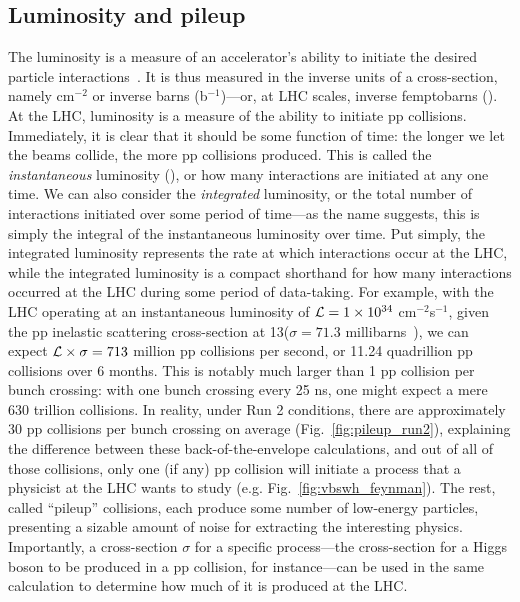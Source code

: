 \subsection{Luminosity and pileup}
The luminosity is a measure of an accelerator's ability to initiate the desired particle interactions~\cite{Herr:941318}. 
It is thus measured in the inverse units of a cross-section, namely cm$^{-2}$ or inverse barns (b$^{-1}$)---or, at LHC scales, inverse femptobarns (\fbinv).
At the LHC, luminosity is a measure of the ability to initiate pp collisions. 
Immediately, it is clear that it should be some function of time: the longer we let the beams collide, the more pp collisions produced. 
This is called the \textit{instantaneous} luminosity (\Lumi), or how many interactions are initiated at any one time. 
We can also consider the \textit{integrated} luminosity, or the total number of interactions initiated over some period of time---as the name suggests, this is simply the integral of the instantaneous luminosity over time. 
Put simply, the integrated luminosity represents the rate at which interactions occur at the LHC, while the integrated luminosity is a compact shorthand for how many interactions occurred at the LHC during some period of data-taking. 
For example, with the LHC operating at an instantaneous luminosity of $\mathcal{L} = 1\times10^{34}$ cm$^{-2}$s$^{-1}$, given the pp inelastic scattering cross-section at 13\TeV ($\sigma = 71.3$ millibarns~\cite{CMS-PAS-FSQ-15-005}), we can expect $\mathcal{L}\times\sigma = 713$ million pp collisions per second, or 11.24 quadrillion pp collisions over 6 months. 
This is notably much larger than 1 pp collision per bunch crossing: with one bunch crossing every 25 ns, one might expect a mere 630 trillion collisions. 
In reality, under Run 2 conditions, there are approximately 30 pp collisions per bunch crossing on average (Fig.~\ref{fig:pileup_run2}), explaining the difference between these back-of-the-envelope calculations, and out of all of those collisions, only one (if any) pp collision will initiate a process that a physicist at the LHC wants to study (e.g. Fig.~\ref{fig:vbswh_feynman}). 
The rest, called ``pileup'' collisions, each produce some number of low-energy particles, presenting a sizable amount of noise for extracting the interesting physics. 
Importantly, a cross-section $\sigma$ for a specific process---the cross-section for a Higgs boson to be produced in a pp collision, for instance---can be used in the same calculation to determine how much of it is produced at the LHC. 

